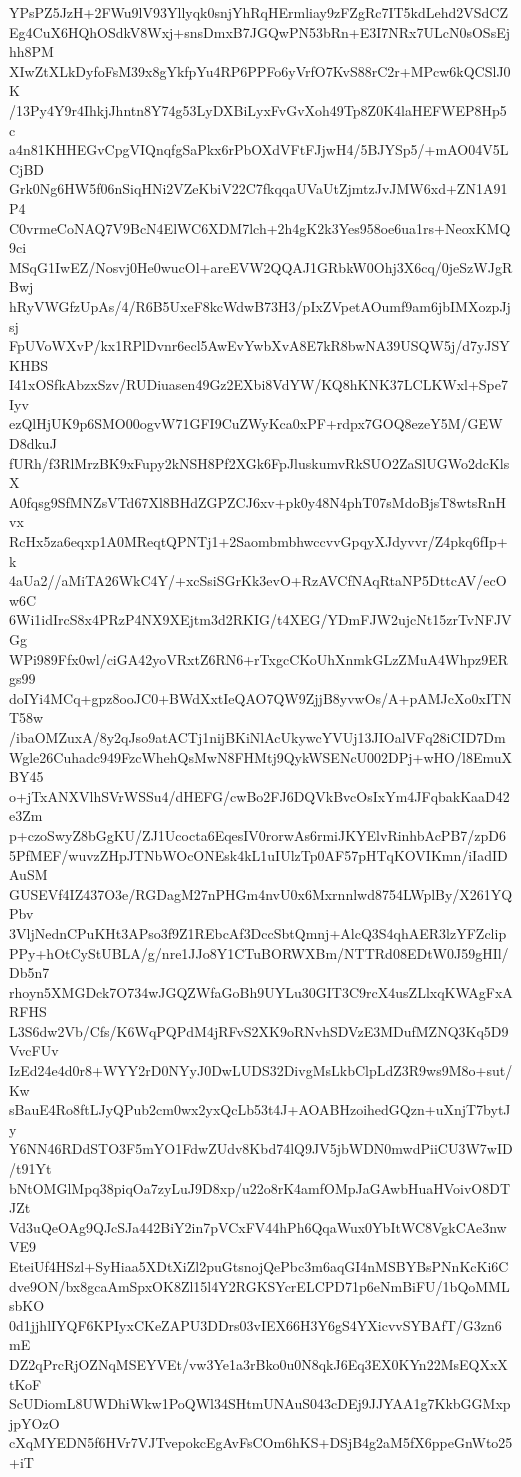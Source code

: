YPsPZ5JzH+2FWu9lV93Yllyqk0snjYhRqHErmliay9zFZgRc7IT5kdLehd2VSdCZ
Eg4CuX6HQhOSdkV8Wxj+snsDmxB7JGQwPN53bRn+E3I7NRx7ULcN0sOSsEjhh8PM
XIwZtXLkDyfoFsM39x8gYkfpYu4RP6PPFo6yVrfO7KvS88rC2r+MPcw6kQCSlJ0K
/13Py4Y9r4IhkjJhntn8Y74g53LyDXBiLyxFvGvXoh49Tp8Z0K4laHEFWEP8Hp5c
a4n81KHHEGvCpgVIQnqfgSaPkx6rPbOXdVFtFJjwH4/5BJYSp5/+mAO04V5LCjBD
Grk0Ng6HW5f06nSiqHNi2VZeKbiV22C7fkqqaUVaUtZjmtzJvJMW6xd+ZN1A91P4
C0vrmeCoNAQ7V9BcN4ElWC6XDM7lch+2h4gK2k3Yes958oe6ua1rs+NeoxKMQ9ci
MSqG1IwEZ/Nosvj0He0wucOl+areEVW2QQAJ1GRbkW0Ohj3X6cq/0jeSzWJgRBwj
hRyVWGfzUpAs/4/R6B5UxeF8kcWdwB73H3/pIxZVpetAOumf9am6jbIMXozpJjsj
FpUVoWXvP/kx1RPlDvnr6ecl5AwEvYwbXvA8E7kR8bwNA39USQW5j/d7yJSYKHBS
I41xOSfkAbzxSzv/RUDiuasen49Gz2EXbi8VdYW/KQ8hKNK37LCLKWxl+Spe7Iyv
ezQlHjUK9p6SMO00ogvW71GFI9CuZWyKca0xPF+rdpx7GOQ8ezeY5M/GEWD8dkuJ
fURh/f3RlMrzBK9xFupy2kNSH8Pf2XGk6FpJluskumvRkSUO2ZaSlUGWo2dcKlsX
A0fqsg9SfMNZsVTd67Xl8BHdZGPZCJ6xv+pk0y48N4phT07sMdoBjsT8wtsRnHvx
RcHx5za6eqxp1A0MReqtQPNTj1+2SaombmbhwccvvGpqyXJdyvvr/Z4pkq6fIp+k
4aUa2//aMiTA26WkC4Y/+xcSsiSGrKk3evO+RzAVCfNAqRtaNP5DttcAV/ecOw6C
6Wi1idIrcS8x4PRzP4NX9XEjtm3d2RKIG/t4XEG/YDmFJW2ujcNt15zrTvNFJVGg
WPi989Ffx0wl/ciGA42yoVRxtZ6RN6+rTxgcCKoUhXnmkGLzZMuA4Whpz9ERgs99
doIYi4MCq+gpz8ooJC0+BWdXxtIeQAO7QW9ZjjB8yvwOs/A+pAMJcXo0xITNT58w
/ibaOMZuxA/8y2qJso9atACTj1nijBKiNlAcUkywcYVUj13JIOalVFq28iCID7Dm
Wgle26Cuhadc949FzcWhehQsMwN8FHMtj9QykWSENcU002DPj+wHO/l8EmuXBY45
o+jTxANXVlhSVrWSSu4/dHEFG/cwBo2FJ6DQVkBvcOsIxYm4JFqbakKaaD42e3Zm
p+czoSwyZ8bGgKU/ZJ1Ucocta6EqesIV0rorwAs6rmiJKYElvRinhbAcPB7/zpD6
5PfMEF/wuvzZHpJTNbWOcONEsk4kL1uIUlzTp0AF57pHTqKOVIKmn/iIadIDAuSM
GUSEVf4IZ437O3e/RGDagM27nPHGm4nvU0x6Mxrnnlwd8754LWplBy/X261YQPbv
3VljNednCPuKHt3APso3f9Z1REbcAf3DccSbtQmnj+AlcQ3S4qhAER3lzYFZclip
PPy+hOtCyStUBLA/g/nre1JJo8Y1CTuBORWXBm/NTTRd08EDtW0J59gHIl/Db5n7
rhoyn5XMGDck7O734wJGQZWfaGoBh9UYLu30GIT3C9rcX4usZLlxqKWAgFxARFHS
L3S6dw2Vb/Cfs/K6WqPQPdM4jRFvS2XK9oRNvhSDVzE3MDufMZNQ3Kq5D9VvcFUv
IzEd24e4d0r8+WYY2rD0NYyJ0DwLUDS32DivgMsLkbClpLdZ3R9ws9M8o+sut/Kw
sBauE4Ro8ftLJyQPub2cm0wx2yxQcLb53t4J+AOABHzoihedGQzn+uXnjT7bytJy
Y6NN46RDdSTO3F5mYO1FdwZUdv8Kbd74lQ9JV5jbWDN0mwdPiiCU3W7wID/t91Yt
bNtOMGlMpq38piqOa7zyLuJ9D8xp/u22o8rK4amfOMpJaGAwbHuaHVoivO8DTJZt
Vd3uQeOAg9QJcSJa442BiY2in7pVCxFV44hPh6QqaWux0YbItWC8VgkCAe3nwVE9
EteiUf4HSzl+SyHiaa5XDtXiZl2puGtsnojQePbc3m6aqGI4nMSBYBsPNnKcKi6C
dve9ON/bx8gcaAmSpxOK8Zl15l4Y2RGKSYcrELCPD71p6eNmBiFU/1bQoMMLsbKO
0d1jjhlIYQF6KPIyxCKeZAPU3DDrs03vIEX66H3Y6gS4YXicvvSYBAfT/G3zn6mE
DZ2qPrcRjOZNqMSEYVEt/vw3Ye1a3rBko0u0N8qkJ6Eq3EX0KYn22MsEQXxXtKoF
ScUDiomL8UWDhiWkw1PoQWl34SHtmUNAuS043cDEj9JJYAA1g7KkbGGMxpjpYOzO
cXqMYEDN5f6HVr7VJTvepokcEgAvFsCOm6hKS+DSjB4g2aM5fX6ppeGnWto25+iT
